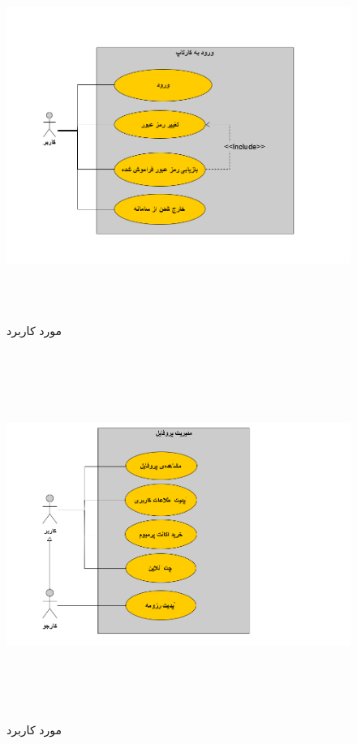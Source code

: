 \begin{figure}[H]
	\caption{مورد کاربرد }
	\begin{center}
		\includegraphics[width=\textwidth, height=12cm]{./images/3}
	\end{center}
\end{figure}

\begin{figure}[H]
	\caption{مورد کاربرد }
	\begin{center}
		\includegraphics[width=\textwidth, height=12cm]{./images/4}
	\end{center}
\end{figure}

